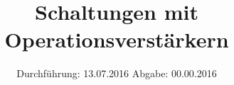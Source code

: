 


\subject{Versuchsprotokoll}
\title{Schaltungen mit Operationsverstärkern}
\date{
  Durchführung: 13.07.2016
  \hspace{3em}
  Abgabe: 00.00.2016
}




\maketitle
\thispagestyle{empty}







\printbibliography



